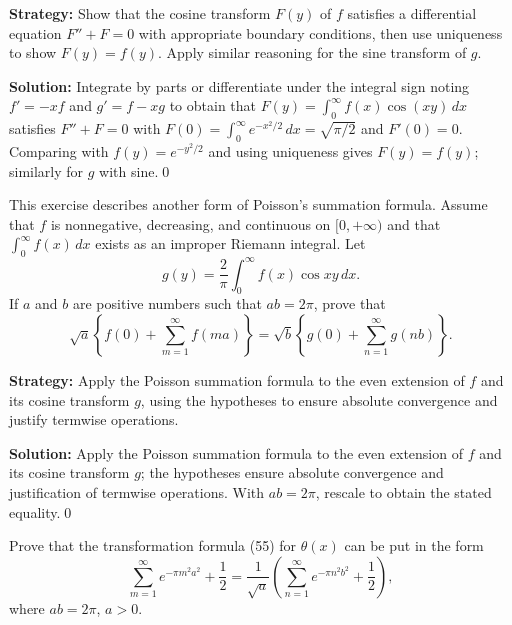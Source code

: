 \noindent\textbf{Strategy:} Show that the cosine transform $F(y)$ of $f$ satisfies a differential equation $F''+F=0$ with appropriate boundary conditions, then use uniqueness to show $F(y)=f(y)$. Apply similar reasoning for the sine transform of $g$.

\bigskip\noindent\textbf{Solution:}
Integrate by parts or differentiate under the integral sign noting $f'= -x f$ and $g'= f- x g$ to obtain that $F(y)=\int_0^{\infty} f(x)\cos(xy)\,dx$ satisfies $F''+F=0$ with $F(0)=\int_0^{\infty} e^{-x^2/2}\,dx=\sqrt{\pi/2}$ and $F'(0)=0$. Comparing with $f(y)=e^{-y^2/2}$ and using uniqueness gives $F(y)=f(y)$; similarly for $g$ with sine.\qed


\begin{problembox}
\begin{problemstatement}
This exercise describes another form of Poisson's summation formula. Assume that $f$ is nonnegative, decreasing, and continuous on $[0, +\infty)$ and that $\int_0^\infty f(x) \, dx$ exists as an improper Riemann integral. Let
\[
g(y) = \frac{2}{\pi} \int_0^\infty f(x) \cos xy \, dx.
\]
If $a$ and $b$ are positive numbers such that $ab = 2\pi$, prove that
\[
\sqrt{a} \left\{ f(0) + \sum_{m=1}^\infty f(ma) \right\} = \sqrt{b} \left\{ g(0) + \sum_{n=1}^\infty g(nb) \right\}.
\]
\end{problemstatement}
\end{problembox}

\noindent\textbf{Strategy:} Apply the Poisson summation formula to the even extension of $f$ and its cosine transform $g$, using the hypotheses to ensure absolute convergence and justify termwise operations.

\bigskip\noindent\textbf{Solution:}
Apply the Poisson summation formula to the even extension of $f$ and its cosine transform $g$; the hypotheses ensure absolute convergence and justification of termwise operations. With $ab=2\pi$, rescale to obtain the stated equality.\qed


\begin{problembox}
\begin{problemstatement}
Prove that the transformation formula (55) for $\theta(x)$ can be put in the form
\[
\sum_{m=1}^\infty e^{-\pi m^2 a^2} + \frac{1}{2} = \frac{1}{\sqrt{a}} \left( \sum_{n=1}^\infty e^{-\pi n^2 b^2} + \frac{1}{2} \right),
\]
where $ab = 2\pi$, $a > 0$.
\end{problemstatement}
\end{problembox}

